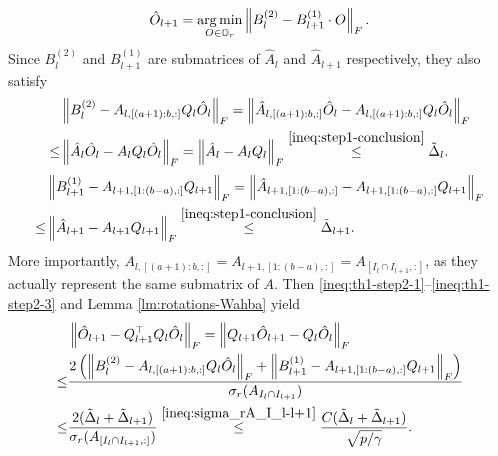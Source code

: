 \documentclass[11pt]{article}
\newcommand{\0}{{\mathbf{0}}}
\newcommand{\1}{{\mathbf{1}}}
\newcommand{\argmin}{\mathop{\rm arg\min}}
\begin{document}
\begin{enumerate}[leftmargin=*]
	\begin{equation}\label{ineq:th1-step2-1}
	\hat{O}_{l+1} = \argmin_{O\in \mathbb{O}_r}\left\|B_l^{(2)} - B_{l+1}^{(1)}\cdot O\right\|_F.
	\end{equation}
	Since $B_l^{(2)}$ and $B_{l+1}^{(1)}$ are submatrices of $\hat{A}_l$ and $\hat{A}_{l+1}$ respectively, they also satisfy
	\begin{equation}\label{ineq:th1-step2-2}
	\begin{split}
	& \left\|B_l^{(2)} - A_{l,[(a+1):b, :]} Q_l\hat{O}_l \right\|_F = \left\|\hat{A}_{l, [(a+1):b, :]}\hat{O}_l - A_{l, [(a+1):b, :]}Q_l\hat{O}_l\right\|_F\\
	\leq & \left\|\hat{A}_l\hat{O}_l - A_l Q_l \hat{O}_l\right\|_F = \left\|\hat{A}_l - A_l Q_l\right\|_F \overset{\eqref{ineq:step1-conclusion}}{\leq} \tilde{\Delta}_l.
	\end{split}
	\end{equation}
	\begin{equation}\label{ineq:th1-step2-3}
	\begin{split}
	& \left\|B_{l+1}^{(1)} - A_{l+1,[1:(b-a), :]} Q_{l+1} \right\|_F = \left\|\hat{A}_{l+1, [1:(b-a), :]} - A_{l+1, [1:(b-a), :]}Q_{l+1}\right\|_F\\
	\leq & \left\|\hat{A}_{l+1} - A_{l+1} Q_{l+1}\right\|_F \overset{\eqref{ineq:step1-conclusion}}{\leq} \tilde{\Delta}_{l+1}.
	\end{split}
	\end{equation}
	More importantly, $A_{l,[(a+1):b, :]} = A_{l+1,[1:(b-a), :]} = A_{[I_l\cap I_{l+1}, :]}$, as they actually represent the same submatrix of $A$. Then \eqref{ineq:th1-step2-1}--\eqref{ineq:th1-step2-3} and Lemma \ref{lm:rotations-Wahba} yield 
	\begin{equation}\label{ineq:th1-step2-4}
	\begin{split}
	& \left\|\hat{O}_{l+1} - Q_{l+1}^\top Q_l\hat{O}_l\right\|_F  = \left\|Q_{l+1}\hat{O}_{l+1} - Q_l\hat{O}_l\right\|_F\\
	\leq & \frac{2\left(\left\|B_l^{(2)} - A_{l,[(a+1):b, :]} Q_l\hat{O}_l \right\|_F + \left\|B_{l+1}^{(1)} - A_{l+1,[1:(b-a), :]} Q_{l+1} \right\|_F\right)}{\sigma_r(A_{I_l\cap I_{l+1}})}\\
	\leq & \frac{2(\tilde{\Delta}_l + \tilde{\Delta}_{l+1})}{\sigma_r(A_{[I_l\cap I_{l+1}, :]})} \overset{\eqref{ineq:sigma_rA_I_l-l+1}}{\leq} \frac{C(\tilde{\Delta}_l + \tilde{\Delta}_{l+1})}{\sqrt{p/\gamma}}.
	\end{split}
	\end{equation}

\end{enumerate}
\end{document}
